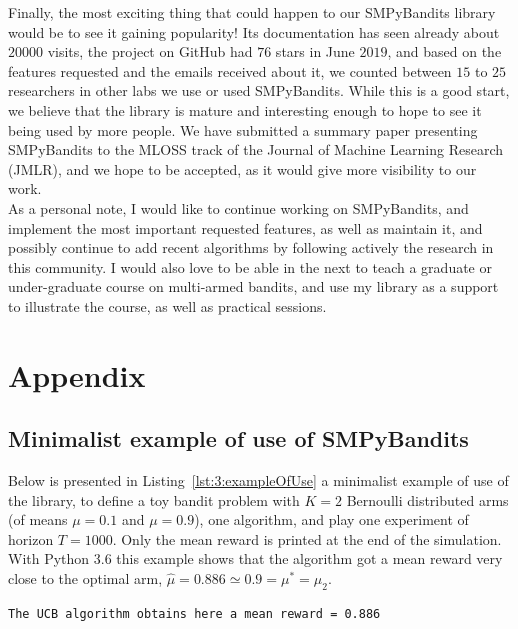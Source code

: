 {Finally, the most exciting thing that could happen to our SMPyBandits library would be to see it gaining popularity!
Its documentation has seen already about $20000$ visits, the project on GitHub had $76$ stars in June $2019$, and based on the features requested and the emails received about it, we counted between $15$ to $25$ researchers in other labs we use or used SMPyBandits.
While this is a good start, we believe that the library is mature and interesting enough to hope to see it being used by more people.
%
We have submitted a summary paper presenting SMPyBandits \cite{SMPyBanditsJMLR} to the MLOSS track of the Journal of Machine Learning Research (JMLR), and we hope to be accepted, as it would give more visibility to our work.\\
%
\indent
As a personal note, I would like to continue working on SMPyBandits, and implement the most important requested features, as well as maintain it, and possibly continue to add recent algorithms by following actively the research in this community.
I would also love to be able in the next to teach a graduate or under-graduate course on multi-armed bandits, and use my library as a support to illustrate the course, as well as practical sessions.


\newpage  %
\section{Appendix}
\label{sec:3:appendix}


\subsection{Minimalist example of use of SMPyBandits}

Below is presented in Listing~\ref{lst:3:exampleOfUse} a minimalist example of use of the library, to define a toy bandit problem with $K=2$ Bernoulli distributed arms (of means $\mu=0.1$ and $\mu=0.9$), one \UCB{} algorithm, and play one experiment of horizon $T=1000$.
Only the mean reward is printed at the end of the simulation.
%
With Python 3.6 this example shows that the algorithm got a mean reward very close to the optimal arm, $\hat{\mu} = 0.886 \simeq 0.9 = \mu^* = \mu_2$.
\begin{verbatim}
The UCB algorithm obtains here a mean reward = 0.886
\end{verbatim}

\begin{small}
    \inputminted[linenos=true,numbersep=5pt,frame=lines,framesep=2mm]{python3}{2-Chapters/3-Chapter/src/example_of_use_of_SMPyBandits.py}
\end{small}


}
